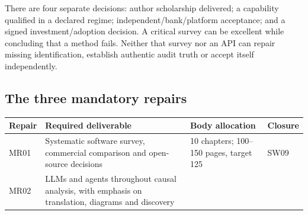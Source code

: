\documentclass[
  11pt,
  a4paper,
]{article}
\begin{document}
There are four separate decisions: author scholarship delivered; a
capability qualified in a declared regime; independent/bank/platform
acceptance; and a signed investment/adoption decision. A critical survey
can be excellent while concluding that a method fails. Neither that
survey nor an API can repair missing identification, establish authentic
audit truth or accept itself independently.

\hypertarget{the-three-mandatory-repairs}{%
\subsection{The three mandatory
repairs}\label{the-three-mandatory-repairs}}

\begin{longtable}[]{@{}llll@{}}
\toprule
\begin{minipage}[b]{0.22\columnwidth}\raggedright
Repair\strut
\end{minipage} & \begin{minipage}[b]{0.22\columnwidth}\raggedright
Required deliverable\strut
\end{minipage} & \begin{minipage}[b]{0.22\columnwidth}\raggedright
Body allocation\strut
\end{minipage} & \begin{minipage}[b]{0.22\columnwidth}\raggedright
Closure\strut
\end{minipage}\tabularnewline
\midrule
\endhead
\begin{minipage}[t]{0.22\columnwidth}\raggedright
MR01\strut
\end{minipage} & \begin{minipage}[t]{0.22\columnwidth}\raggedright
Systematic software survey, commercial comparison and open-source
decisions\strut
\end{minipage} & \begin{minipage}[t]{0.22\columnwidth}\raggedright
10 chapters; 100--150 pages, target 125\strut
\end{minipage} & \begin{minipage}[t]{0.22\columnwidth}\raggedright
SW09\strut
\end{minipage}\tabularnewline
\begin{minipage}[t]{0.22\columnwidth}\raggedright
MR02\strut
\end{minipage} & \begin{minipage}[t]{0.22\columnwidth}\raggedright
LLMs and agents throughout causal analysis, with emphasis on
translation, diagrams and discovery\strut

\end{minipage}
\end{longtable}
\end{document}
